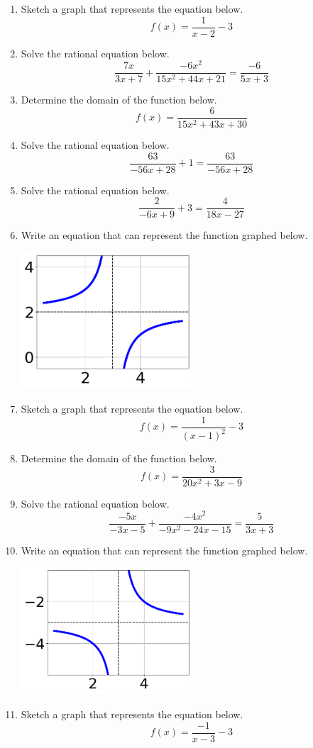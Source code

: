 \documentclass[14pt]{extbook}
\begin{document}
\begin{enumerate}
{\begin{center}
\end{center}
} \newpage
\item{
Sketch a graph that represents the equation below.\[ f(x) = \frac{1}{x - 2} - 3 \]} \newpage
\item{
Solve the rational equation below.\[ \frac{7x}{3x + 7} + \frac{-6x^{2}}{15x^{2} +44 x + 21} = \frac{-6}{5x + 3} \]} \newpage
\item{
Determine the domain of the function below.\[ f(x) = \frac{6}{15x^{2} +43 x + 30} \]} \newpage
\item{
Solve the rational equation below.\[ \frac{63}{-56x + 28} + 1 = \frac{63}{-56x + 28} \]} \newpage
\item{
Solve the rational equation below.\[ \frac{2}{-6x + 9} + 3 = \frac{4}{18x -27} \]} \newpage
\item{
Write an equation that can represent the function graphed below.
\begin{center}
    \includegraphics[width=0.5\textwidth]{../Figures/rationalGraphToEquationC.png}
\end{center}
} \newpage
\item{
Sketch a graph that represents the equation below.\[ f(x) = \frac{1}{(x - 1)^2} - 3 \]} \newpage
\item{
Determine the domain of the function below.\[ f(x) = \frac{3}{20x^{2} +3 x -9} \]} \newpage
\item{
Solve the rational equation below.\[ \frac{-5x}{-3x -5} + \frac{-4x^{2}}{-9x^{2} -24 x -15} = \frac{5}{3x + 3} \]} \newpage
\item{
Write an equation that can represent the function graphed below.
\begin{center}
    \includegraphics[width=0.5\textwidth]{../Figures/rationalGraphToEquationCopyC.png}
\end{center}
} \newpage
\item{
Sketch a graph that represents the equation below.\[ f(x) = \frac{-1}{x - 3} - 3 \]} \newpage
\end{enumerate}
\end{document}
